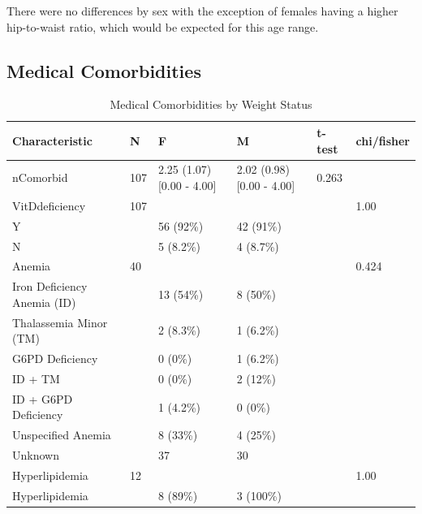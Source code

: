 \documentclass[
]{article}
\begin{document}
There were no differences by sex with the exception of females having a
higher hip-to-waist ratio, which would be expected for this age range.

\FloatBarrier
\clearpage

\hypertarget{medical-comorbidities-1}{%
\subsection{Medical Comorbidities}\label{medical-comorbidities-1}}

\begin{table}[!h]

\caption{\label{tab:Med_sex_tab}Medical Comorbidities by Weight Status}
\centering
\begin{tabular}[t]{llllll}
\toprule
Characteristic & N & F & M & t-test & chi/fisher\\
\midrule
nComorbid & 107 & 2.25 (1.07)   [0.00 - 4.00] & 2.02 (0.98)   [0.00 - 4.00] & 0.263 & \\
VitDdeficiency & 107 &  &  &  & 1.00\\
\hspace{1em}Y &  & 56 (92\%) & 42 (91\%) &  & \\
\hspace{1em}N &  & 5 (8.2\%) & 4 (8.7\%) &  & \\
Anemia & 40 &  &  &  & 0.424\\
\addlinespace
\hspace{1em}Iron Deficiency Anemia (ID) &  & 13 (54\%) & 8 (50\%) &  & \\
\hspace{1em}Thalassemia Minor (TM) &  & 2 (8.3\%) & 1 (6.2\%) &  & \\
\hspace{1em}G6PD Deficiency &  & 0 (0\%) & 1 (6.2\%) &  & \\
\hspace{1em}ID + TM &  & 0 (0\%) & 2 (12\%) &  & \\
\hspace{1em}ID + G6PD Deficiency &  & 1 (4.2\%) & 0 (0\%) &  & \\
\addlinespace
\hspace{1em}Unspecified Anemia &  & 8 (33\%) & 4 (25\%) &  & \\
\hspace{1em}Unknown &  & 37 & 30 &  & \\
Hyperlipidemia & 12 &  &  &  & 1.00\\
\hspace{1em}Hyperlipidemia &  & 8 (89\%) & 3 (100\%) &  & \\

\end{tabular}
\end{table}
\end{document}

